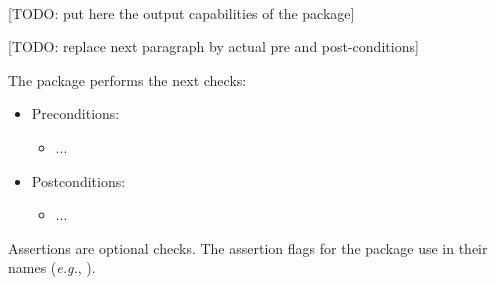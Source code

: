   \\



[TODO: put here the output capabilities of the package]



[TODO: replace next paragraph by actual pre and post-conditions]

The package performs the next checks:

\begin{itemize}
\item Preconditions:
    \begin{itemize}
    \item ...
    \end{itemize}
\item Postconditions:
    \begin{itemize}
    \item ...
    \end{itemize}
\end{itemize}

Assertions are optional checks. The assertion flags for the package
use  in their names (\textit{e.g.},
).


